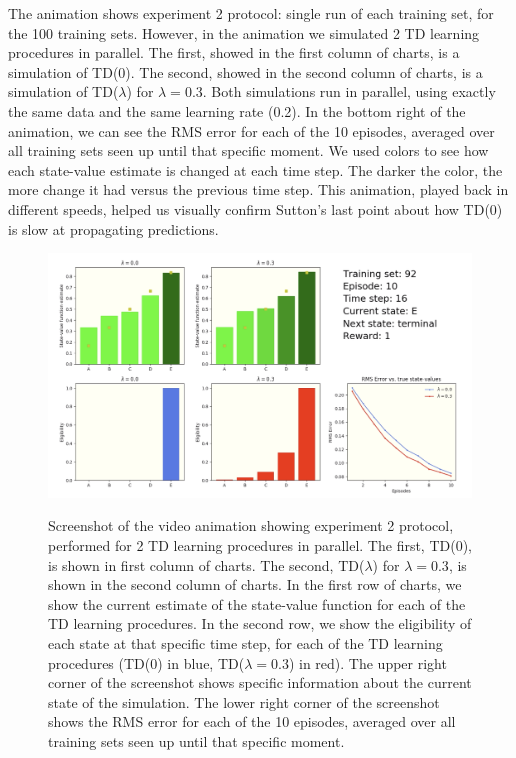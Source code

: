 \documentclass{article}
\begin{document}
The animation shows experiment 2 protocol: single run of each training set, for the 100 training sets.
However, in the animation we simulated 2 TD learning procedures in parallel.
The first, showed in the first column of charts, is a simulation of TD(0).
The second, showed in the second column of charts, is a simulation of TD($\lambda$) for $\lambda = 0.3$.
Both simulations run in parallel, using exactly the same data and the same learning rate (0.2).
In the bottom right of the animation, we can see the RMS error for each of the 10 episodes, averaged over all training sets seen up until that specific moment.
We used colors to see how each state-value estimate is changed at each time step.
The darker the color, the more change it had versus the previous time step.
This animation, played back in different speeds, helped us visually confirm Sutton's last point about how TD(0) is slow at propagating predictions.
\begin{figure}[t]
    \includegraphics[width=\textwidth]{./images/screenshot.png}
    \centering
    \label{fig:fig3}
    \caption{Screenshot of the video animation showing experiment 2 protocol, performed for 2 TD learning procedures in parallel.
    The first, TD(0), is shown in first column of charts.
    The second, TD($\lambda$) for $\lambda = 0.3$, is shown in the second column of charts.
    In the first row of charts, we show the current estimate of the state-value function for each of the TD learning procedures.
    In the second row, we show the eligibility of each state at that specific time step, for each of the TD learning procedures (TD(0) in blue, TD($\lambda = 0.3$) in red).
    The upper right corner of the screenshot shows specific information about the current state of the simulation.
    The lower right corner of the screenshot shows the RMS error for each of the 10 episodes, averaged over all training sets seen up until that specific moment.}
\end{figure}
\end{document}
